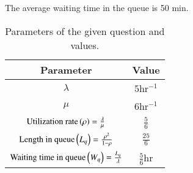 The average waiting time in the queue is 50 min.
\newpage
\begin{table}[h!]
\centering
\resizebox{\columnwidth}{!}
{
    \begin{tabular}{|c|c|}
    \hline
    Parameter & Value \\
    \hline
    $\lambda$ & $5$hr$^{-1}$\\
    \hline
    $\mu$ & $6$hr$^{-1}$\\
    \hline
    $\text{Utilization rate}\left(\rho\right)=\frac{\lambda}{\mu}$ & $\frac{5}{6}$\\[1ex]
    \hline
    $\text{Length in queue}\left(L_q\right)=\frac{\rho^2}{1-\rho}$ & $\frac{25}{6}$\\[1ex]
    \hline
    $\text{Waiting time in queue}\left(W_q\right)=\frac{L_q}{\lambda}$ & $\frac{5}{6}$hr\\[1ex]
    \hline     
    \end{tabular}
}
    \caption{Parameters of the given question and values.}
    \label{me2011-19:TABLE-1}
\end{table}